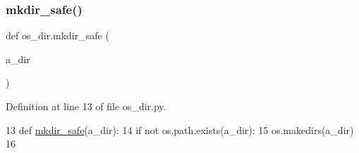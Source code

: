 \subsubsection{\texorpdfstring{mkdir\+\_\+safe()}{mkdir\_safe()}}
{\footnotesize\ttfamily def os\+\_\+dir.\+mkdir\+\_\+safe (\begin{DoxyParamCaption}\item[{}]{a\+\_\+dir }\end{DoxyParamCaption})}



Definition at line 13 of file os\+\_\+dir.\+py.


\begin{DoxyCode}
13 \textcolor{keyword}{def }\mbox{\hyperlink{namespaceos__dir_ad1414a4868a8da9c6cd962203048d22c}{mkdir\_safe}}(a\_dir):
14     \textcolor{keywordflow}{if} \textcolor{keywordflow}{not} os.path.exists(a\_dir):
15         os.makedirs(a\_dir)
16         
\end{DoxyCode}
